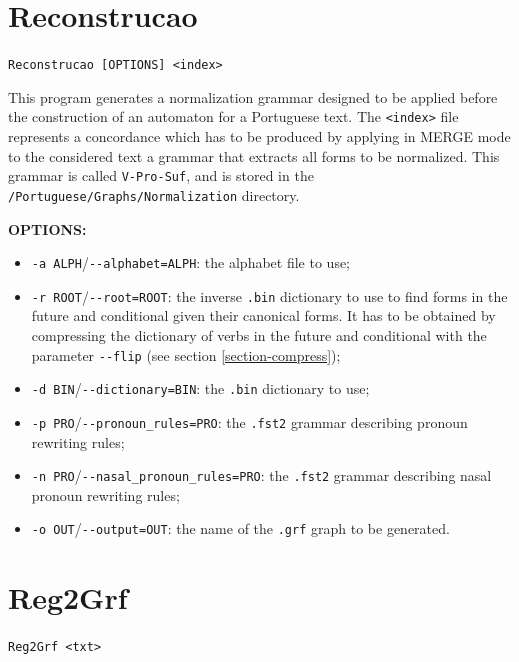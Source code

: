 \section{Reconstrucao}
\verb+Reconstrucao [OPTIONS] <index>+

\bigskip
\noindent This program generates a normalization grammar designed to be applied
before the construction of an automaton for a Portuguese text. The \verb+<index>+ file
represents a concordance which has to be produced by applying in MERGE mode to
the considered text a grammar that extracts all forms to be normalized. This
grammar is called \verb+V-Pro-Suf+, and is stored in the
\verb+/Portuguese/Graphs/Normalization+ directory.

\bigskip
\noindent \textbf{OPTIONS:}
\begin{itemize}
  \item \verb+-a ALPH+/\verb+--alphabet=ALPH+: the alphabet file to use;

  \item \verb+-r ROOT+/\verb+--root=ROOT+: the inverse \verb+.bin+
  dictionary to use to find forms in the future and conditional given their
  canonical forms. It has to be obtained by compressing the dictionary of verbs
  in the future and conditional with the parameter \verb+--flip+ (see section
  \ref{section-compress});
  
  \item \verb+-d BIN+/\verb+--dictionary=BIN+: the \verb+.bin+ dictionary to use;
  
  \item \verb+-p PRO+/\verb+--pronoun_rules=PRO+: the \verb+.fst2+ grammar
  describing pronoun rewriting rules;
  
  \item \verb+-n PRO+/\verb+--nasal_pronoun_rules=PRO+: the \verb+.fst2+ grammar
  describing nasal pronoun rewriting rules;

  \item \verb+-o OUT+/\verb+--output=OUT+: the name of the \verb+.grf+ graph to
  be generated.
\end{itemize}







\section{Reg2Grf}
\verb+Reg2Grf <txt>+


